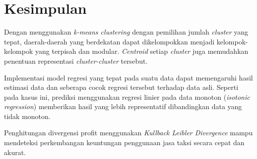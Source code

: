 \documentclass{article}
\begin{document}
\section{Kesimpulan}

Dengan menggunakan \textit{k-means clustering} dengan pemilihan jumlah \textit{cluster} yang tepat, daerah-daerah yang berdekatan dapat dikelompokkan menjadi kelompok-kelompok yang terpisah dan modular. \textit{Centroid} setiap \textit{cluster} juga memudahkan penentuan representasi \textit{cluster-cluster} tersebut.

Implementasi model regresi yang tepat pada suatu data dapat memengaruhi hasil estimasi data dan seberapa cocok regresi tersebut terhadap data asli. Seperti pada kasus ini, prediksi menggunakan regresi linier pada data monoton (\textit{isotonic regression}) memberikan hasil yang lebih representatif dibandingkan data yang tidak monoton.

Penghitungan divergensi profit menggunakan \textit{Kullback Leibler Divergence} mampu mendeteksi perkembangan keuntungan penggunaan jasa taksi secara cepat dan akurat.
\end{document}
